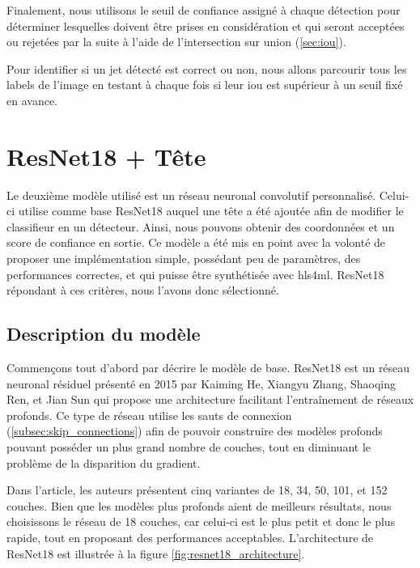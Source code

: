 Finalement, nous utilisons le seuil de confiance assigné à chaque détection pour déterminer lesquelles doivent être prises en considération et qui seront acceptées ou rejetées par la suite à l'aide de l'intersection sur union (\ref{sec:iou}). 

Pour identifier si un jet détecté est correct ou non, nous allons parcourir tous les labels de l'image en testant à chaque fois si leur \acrshort{iou} est supérieur à un seuil fixé en avance.

\newpage

\section{ResNet18 + Tête}
\label{sec:resnet18}

Le deuxième modèle utilisé est un réseau neuronal convolutif personnalisé. Celui-ci utilise comme base ResNet18 auquel une tête a été ajoutée afin de modifier le classifieur en un détecteur. Ainsi, nous pouvons obtenir des coordonnées et un score de confiance en sortie. Ce modèle a été mis en point avec la volonté de proposer une implémentation simple, possédant peu de paramètres, des performances correctes, et qui puisse être synthétisée avec \acrshort{hls4ml}. ResNet18 répondant à ces critères, nous l'avons donc sélectionné.

\subsection{Description du modèle}

Commençons tout d'abord par décrire le modèle de base. ResNet18 est un réseau neuronal résiduel présenté en 2015 par Kaiming He, Xiangyu Zhang, Shaoqing Ren, et Jian Sun \cite{he_deep_2015} qui propose une architecture facilitant l'entraînement de réseaux profonds. Ce type de réseau utilise les sauts de connexion (\ref{subsec:skip_connections}) afin de pouvoir construire des modèles profonds pouvant posséder un plus grand nombre de couches, tout en diminuant le problème de la disparition du gradient.

Dans l'article, les auteurs présentent cinq variantes de 18, 34, 50, 101, et 152 couches. Bien que les modèles plus profonds aient de meilleurs résultats, nous choisissons le réseau de 18 couches, car celui-ci est le plus petit et donc le plus rapide, tout en proposant des performances acceptables. L'architecture de ResNet18 est illustrée à la figure \ref{fig:resnet18_architecture}.

